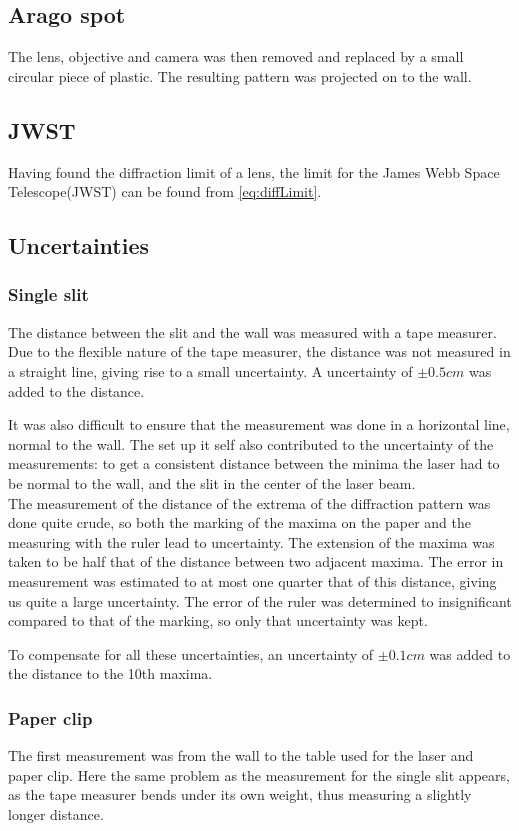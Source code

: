 \documentclass{emulateapj}
\begin{document}
\subsection{Arago spot}
The lens, objective and camera was then removed and replaced by a small circular piece of plastic. The resulting pattern was projected on to the wall.

\subsection{JWST} 
Having found the diffraction limit of a lens, the limit for the James Webb Space Telescope(JWST) can be found from \eqref{eq:diffLimit}. 

\subsection{Uncertainties}
\subsubsection{Single slit}
The distance between the slit and the wall was measured with a tape measurer. Due to the flexible nature of the tape measurer, the distance was not measured in a straight line, giving rise to a small uncertainty. A uncertainty of $\pm 0.5 cm$ was added to the distance.

It was also difficult to ensure that the measurement was done in a horizontal line, normal to the wall. The set up it self also contributed to the uncertainty of the measurements: to get a consistent distance between the minima the laser had to be normal to the wall, and the slit in the center of the laser beam. \\

The measurement of the distance of the extrema of the diffraction pattern was done quite crude, so both the marking of the maxima on the paper and the measuring with the ruler lead to uncertainty. The extension of the maxima was taken to be half that of the distance between two adjacent maxima. The error in measurement was estimated to at most one quarter that of this distance, giving us quite a large uncertainty. The error of the ruler was determined to insignificant compared to that of the marking, so only that uncertainty was kept.

To compensate for all these uncertainties, an uncertainty of $\pm 0.1 cm$ was added to the distance to the 10th maxima.


\subsubsection{Paper clip}
The first measurement was from the wall to the table used for the laser and paper clip. Here the same problem as the measurement for the single slit appears, as the tape measurer bends under its own weight, thus measuring a slightly longer distance. 
\end{document}

